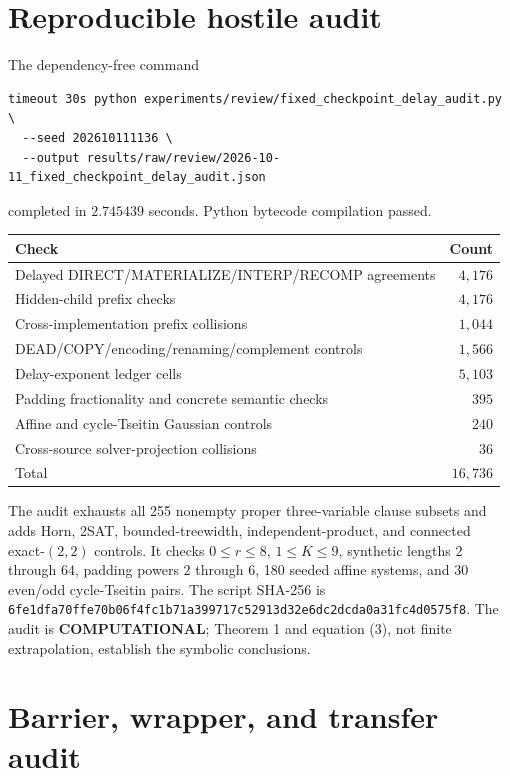 \documentclass[11pt]{article}
\newcommand{\COMP}{\textbf{COMPUTATIONAL}}
\begin{document}
\section{Reproducible hostile audit}

The dependency-free command
\begin{verbatim}
timeout 30s python experiments/review/fixed_checkpoint_delay_audit.py \
  --seed 202610111136 \
  --output results/raw/review/2026-10-11_fixed_checkpoint_delay_audit.json
\end{verbatim}
completed in $2.745439$ seconds.  Python bytecode compilation passed.

\begin{center}
\begin{tabular}{lr}
\toprule
Check & Count\\
\midrule
Delayed DIRECT/MATERIALIZE/INTERP/RECOMP agreements & $4{,}176$\\
Hidden-child prefix checks & $4{,}176$\\
Cross-implementation prefix collisions & $1{,}044$\\
DEAD/COPY/encoding/renaming/complement controls & $1{,}566$\\
Delay-exponent ledger cells & $5{,}103$\\
Padding fractionality and concrete semantic checks & $395$\\
Affine and cycle-Tseitin Gaussian controls & $240$\\
Cross-source solver-projection collisions & $36$\\
\midrule
Total & $16{,}736$\\
\bottomrule
\end{tabular}
\end{center}

The audit exhausts all 255 nonempty proper three-variable clause subsets and
adds Horn, 2SAT, bounded-treewidth, independent-product, and connected
exact-$(2,2)$ controls.  It checks $0\le r\le8$, $1\le K\le9$, synthetic
lengths $2$ through $64$, padding powers $2$ through $6$, 180 seeded affine
systems, and 30 even/odd cycle-Tseitin pairs.  The script SHA-256 is
\nolinkurl{6fe1dfa70ffe70b06f4fc1b71a399717c52913d32e6dc2dcda0a31fc4d0575f8}.
The audit is \COMP; Theorem 1 and equation (3), not finite extrapolation,
establish the symbolic conclusions.

\section{Barrier, wrapper, and transfer audit}
\end{document}
